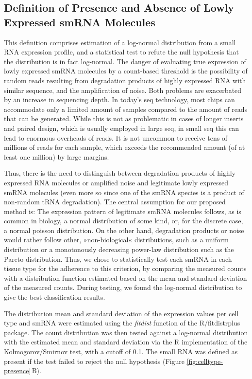 \begin{method}
\subsection[Definition of Presence and Absence of Lowly Expressed\texorpdfstring{\\}{} smRNA Molecules]{Definition of Presence and Absence of Lowly Expressed smRNA Molecules} \label{sec:stroke:presence}
This definition comprises estimation of a log-normal distribution from a small RNA expression profile, and a statistical test to refute the null hypothesis that the distribution is in fact log-normal. The danger of evaluating true expression of lowly expressed smRNA molecules by a count-based threshold is the possibility of random reads resulting from degradation products of highly expressed RNA with similar sequence, and the amplification of noise. Both problems are exacerbated by an increase in sequencing depth. In today's \ac{seq} technology, most chips can accommodate only a limited amount of samples compared to the amount of reads that can be generated. While this is not as problematic in cases of longer inserts and paired design, which is usually employed in large \ac{seq}, in small \ac{seq} this can lead to enormous overheads of reads. It is not uncommon to receive tens of millions of reads for each sample, which exceeds the recommended amount (of at least one million) by large margins.

Thus, there is the need to distinguish between degradation products of highly expressed RNA molecules or amplified noise and legitimate lowly expressed smRNA molecules (even more so since one of the smRNA species is a product of non-random tRNA degradation). The central assumption for our proposed method is: The expression pattern of legitimate smRNA molecules follows, as is common in biology, a normal distribution of some kind, or, for the discrete case, a normal poisson distribution. On the other hand, degradation products or noise would rather follow other, »non-biological« distributions, such as a uniform distribution or a monotonously decreasing power-law distribution such as the Pareto distribution. Thus, we chose to statistically test each smRNA in each tissue type for the adherence to this criterion, by comparing the measured counts with a distribution function estimated based on the mean and standard deviation of the measured counts. During testing, we found the log-normal distribution to give the best classification results.
 
The distribution mean and standard deviation of the expression values per cell type and smRNA were estimated using the \emph{fitdist} function of the R/fitdistrplus package.\cite{Delignette-Muller2015} The count distribution was then tested against a log-normal distribution with the estimated mean and standard deviation via the R implementation of the Kolmogorov\=/Smirnov test, with a cutoff of 0.1. The small RNA was defined as present if the test failed to reject the null hypothesis (Figure \ref{fig:celltype-presence}\,B).


\end{method}
